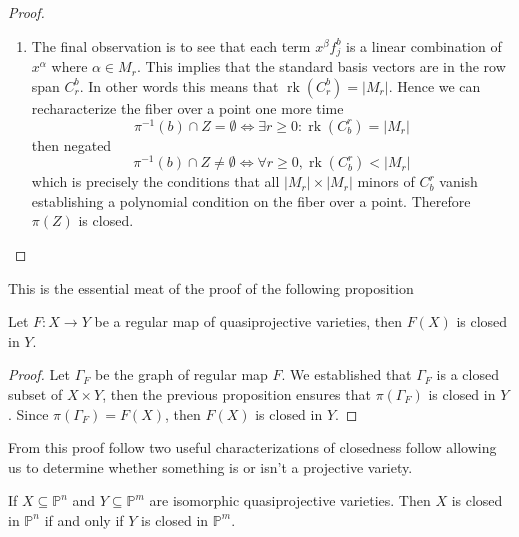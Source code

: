 \documentclass[40pt]{article}
\newcommand{\Proj}{\mathbb{P}}
\DeclareMathOperator{\rank}{\text{rk}}
\theoremstyle{remark}
\begin{document}
\begin{proof}
\begin{enumerate}
					\[
					g_j = \sum_\beta a_{\beta,j}x^\beta
					\]
					then,
					\[
					x^\alpha = \sum_{j=1}^k \sum_\beta a_{\beta,j}x^\beta f_j^b.
					\]
					Since $x^\alpha$ is homogeneous, both terms in the summan must be homogeneous then take $d_j$ to be the homogeneous degree of $f_j^b$ and we see that $\beta \in M_{\beta - d_j}$. Examining individual monomials in the summand we see that 
					\[
					x^\beta f_j^b = \sum_\alpha c_{(\beta, j),\alpha}^bx^\alpha
					\]
					and observe that the coordinates $c_{(\beta, j), \alpha}$ can be used to populate matrix $C_r^b$ where the columns are indexed by $M_r$ and the rows are indexed by pairs $(\beta, j)$ with $\beta \in M_{r - d_j}$. 
					\item[r)] The final observation is to see that each term $x^\beta f_j^b$ is a linear combination of $x^\alpha$ where $\alpha \in M_r$. This implies that the standard basis vectors are in the row span $C_r^b$. In other words this means that $\rank(C_r^b) = |M_r|$. Hence we can recharacterize the fiber over a point one more time 
					\[
					\pi^{-1}(b)\cap Z = \emptyset \iff \exists r \geq 0 \colon \rank(C_b^r) = |M_r|
					\]
					then negated
					\[
					\pi^{-1}(b)\cap Z \neq \emptyset \iff \forall r \geq 0, \rank(C_b^r) < |M_r|
					\]
					which is precisely the conditions that all $|M_r|\times |M_r|$ minors of $C_b^r$ vanish establishing a polynomial condition on the fiber over a point. Therefore $\pi(Z)$ is closed.
				\end{enumerate}
			\end{proof}
			This is the essential meat of the proof of the following proposition
			\begin{prop}
				Let $F :X \to Y$ be a regular map of quasiprojective varieties, then $F(X)$ is closed in $Y$. 
			\end{prop}
			\begin{proof}
				Let $\Gamma_F$ be the graph of regular map $F$. We established that $\Gamma_F$ is a closed subset of $X \times Y$, then the previous proposition ensures that $\pi(\Gamma_F)$ is closed in $Y$. Since $\pi(\Gamma_F) =  F(X)$, then $F(X)$ is closed in $Y$. 
			\end{proof}
			From this proof follow two useful characterizations of closedness follow allowing us to determine whether something is or isn't a projective variety. 
			\begin{prop}
				If $X \subseteq \Proj^n$ and $Y \subseteq \Proj^m$ are isomorphic quasiprojective varieties. Then $X$ is closed in $\Proj^n$ if and only if $Y$ is closed in $\Proj^m$. 
			\end{prop}
\end{document}
